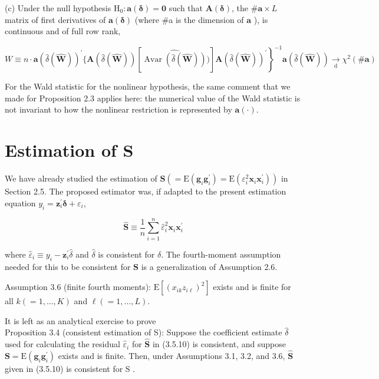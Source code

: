 \documentclass[10pt]{article}
\begin{document}
(c) Under the null hypothesis $\mathrm{H}_{0}: \mathbf{a}(\boldsymbol{\delta})=\mathbf{0}$ such that $\mathbf{A}(\boldsymbol{\delta})$, the $\# \mathbf{a} \times L$ matrix of first derivatives of $\mathbf{a}(\boldsymbol{\delta})$ (where \#a is the dimension of $\mathbf{a}$ ), is continuous and of full row rank,


\begin{equation*}
\left.W \equiv n \cdot \mathbf{a}(\hat{\delta}(\widehat{\mathbf{W}}))^{\prime}\{\mathbf{A}(\hat{\delta}(\widehat{\mathbf{W}}))[\widehat{\operatorname{Avar}(\hat{\delta}(\widehat{\mathbf{W}}))})] \mathbf{A}(\hat{\delta}(\widehat{\mathbf{W}}))^{\prime}\right\}^{-1} \mathbf{a}(\hat{\delta}(\widehat{\mathbf{W}})) \underset{\mathrm{d}}{\rightarrow} \chi^{2}(\# \mathbf{a}) \tag{3.5.9}
\end{equation*}


For the Wald statistic for the nonlinear hypothesis, the same comment that we made for Proposition 2.3 applies here: the numerical value of the Wald statistic is not invariant to how the nonlinear restriction is represented by $\mathbf{a}(\cdot)$.

\section*{Estimation of S}
We have already studied the estimation of $\mathbf{S}\left(=\mathrm{E}\left(\mathbf{g}_{i} \mathbf{g}_{i}^{\prime}\right)=\mathrm{E}\left(\varepsilon_{i}^{2} \mathbf{x}_{i} \mathbf{x}_{i}^{\prime}\right)\right)$ in Section 2.5. The proposed estimator was, if adapted to the present estimation equation $y_{i}=\mathbf{z}_{i}^{\prime} \boldsymbol{\delta}+\varepsilon_{i}$,


\begin{equation*}
\widehat{\mathbf{S}} \equiv \frac{1}{n} \sum_{i=1}^{n} \hat{\varepsilon}_{i}^{2} \mathbf{x}_{i} \mathbf{x}_{i}^{\prime} \tag{3.5.10}
\end{equation*}


where $\hat{\varepsilon}_{i} \equiv y_{i}-\mathbf{z}_{i}^{\prime} \hat{\delta}$ and $\hat{\delta}$ is consistent for $\delta$. The fourth-moment assumption needed for this to be consistent for $\mathbf{S}$ is a generalization of Assumption 2.6.

Assumption 3.6 (finite fourth moments): $\mathrm{E}\left[\left(x_{i k} z_{i \ell}\right)^{2}\right]$ exists and is finite for all $k(=1, \ldots, K)$ and $\ell(=1, \ldots, L)$.

It is left as an analytical exercise to prove\\
Proposition 3.4 (consistent estimation of S): Suppose the coefficient estimate $\hat{\delta}$ used for calculating the residual $\hat{\varepsilon}_{i}$ for $\widehat{\mathbf{S}}$ in (3.5.10) is consistent, and suppose $\mathbf{S}=\mathrm{E}\left(\mathbf{g}_{i} \mathbf{g}_{i}^{\prime}\right)$ exists and is finite. Then, under Assumptions 3.1, 3.2, and 3.6, $\widehat{\mathbf{S}}$ given in (3.5.10) is consistent for S .
\end{document}

